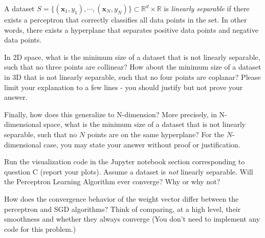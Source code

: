 \begin{problem}[4]
  A dataset $S = \{(\mathbf{x}_1, y_1),\cdots,(\mathbf{x}_N, y_N)\} \subset \mathbb{R}^d \times \mathbb{R}$ is \emph{linearly separable} if there exists a perceptron that correctly classifies all data points in the set. In other words, there exists a hyperplane that separates positive data points and negative data points.

  In 2D space, what is the minimum size of a dataset that is not linearly separable, such that no three points are collinear? How about the minimum size of a dataset in 3D that is not linearly separable, such that no four points are coplanar? Please limit your explanation to a few lines - you should justify but not prove your answer.

  Finally, how does this generalize to N-dimension? More precisely, in N-dimensional space, what is the minimum size of a dataset that is not linearly separable, such that no $N$ points are on the same hyperplane? For the $N$-dimensional case, you may state your answer without proof or justification.
\end{problem}
\begin{solution}

\end{solution}

\begin{problem}[2]
  Run the visualization code in the Jupyter notebook section corresponding to question C (report your plots). Assume a dataset is \emph{not} linearly separable. Will the Perceptron Learning Algorithm ever converge? Why or why not?
\end{problem}
\begin{solution}

\end{solution}

\begin{problem}[2]
How does the convergence behavior of the weight vector differ between the perceptron and SGD algorithms? Think of comparing, at a high level, their smoothness and whether they always converge (You don't need to implement any code for this problem.)
\end{problem}
\begin{solution}
\end{solution}
